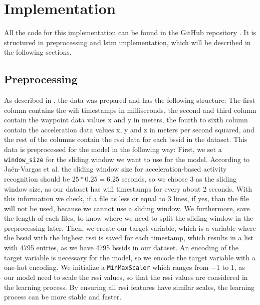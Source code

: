 \chapter{Implementation}\label{ch:implementation}

All the code for this implementation can be found in the GitHub repository \cite{github-repo}.
It is structured in preprocessing and \ac{lstm} implementation, which will be described in the following sections.

\section{Preprocessing}
As described in , the data was prepared and has the following structure:
The first column contains the \ac{wifi} timestamps in milliseconds, the second and third column contain the waypoint data values x and y in meters, the fourth to sixth column contain the acceleration data values x, y and z in meters per second squared, and the rest of the columns contain the \ac{rssi} data for each \ac{bssid} in the dataset.
This data is preprocessed for the model in the following way:
First, we set a \texttt{window\_size} for the sliding window we want to use for the model.
According to Ja{\'e}n-Vargas et al. \cite{EffectsSlidingWindow2022} the sliding window size for acceleration-based activity recognition should be \(25 * 0.25 = 6.25\) seconds, so we choose \(3\) as the sliding window size, as our dataset has \ac{wifi} timestamps for every about 2 seconds.
With this information we check, if a file as less or equal to \(3\) lines, if yes, than the file will not be used, because we cannot use a sliding window.
We furthermore, save the length of each files, to know where we need to split the sliding window in the preprocessing later.
Then, we create our target variable, which is a variable where the \ac{bssid} with the highest \ac{rssi} is saved for each timestamp, which results in a list with 4795 entries, as we have 4795 \acp{bssid} in our dataset.
An encoding of the target variable is necessary for the model, so we encode the target variable with a one-hot encoding.
We initialize a \texttt{MinMaxScaler} which ranges from \(-1\) to \(1\), as our model need to scale the \ac{rssi} values, so that the \ac{rssi} values are considered in the learning process.
By ensuring all \ac{rssi} features have similar scales, the learning process can be more stable and faster. 


